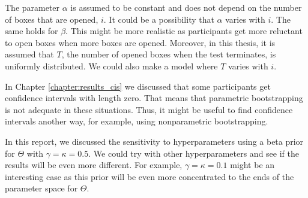 The parameter $\alpha$ is assumed to be constant and does not depend on the number of boxes that are opened, $i$. It could be a possibility that $\alpha$ varies with $i$. The same holds for $\beta$. This might be more realistic as participants get more reluctant to open boxes when more boxes are opened.
Moreover, in this thesis, it is assumed that $T$, the number of opened boxes when the test terminates, is uniformly distributed. We could also make a model where $T$ varies with $i$. 

In Chapter \ref{chapter:results_cis} we discussed that some participants get confidence intervals with length zero. That means that parametric bootstrapping is not adequate in these situations. Thus, it might be useful to find confidence intervals another way, for example, using nonparametric bootstrapping. 

In this report, we discussed the sensitivity to hyperparameters using a beta prior for $\Theta$ with $\gamma=\kappa=0.5$. We could try with other hyperparameters and see if the results will be even more different. For example, $\gamma=\kappa=0.1$ might be an interesting case as this prior will be even more concentrated to the ends of the parameter space for $\Theta$. 


